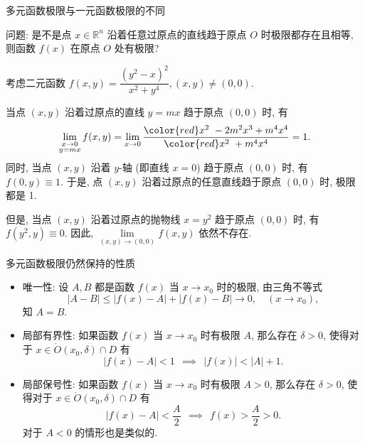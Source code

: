 \begin{frame}{多元函数极限与一元函数极限的不同}


问题: 是不是点 $x \in \mathbb{R}^n$ 沿着任意过原点的直线趋于原点 $O$ 时极限都存在且相等, 则函数 $f(x)$ 在原点 $O$ 处有极限?

\pause

\begin{eg}
考虑二元函数 $f(x, y) = \dfrac{(y^2 - x)^2}{x^2 + y^4}, (x, y) \neq (0, 0).$

\pause

当点 $(x, y)$ 沿着过原点的直线 $y = mx$ 趋于原点 $(0, 0)$ 时, 有
\[\lim\limits_{\substack{x \to 0 \\ y = mx}} f(x, y) = \lim\limits_{x \to 0} \dfrac{{\color{red}x^2} ~ - 2m^2x^3 + m^4 x^4}{{\color{red}x^2} ~ + m^4 x^4} = 1.\]
同时, 当点 $(x, y)$ 沿着 $y$-轴 (即直线 $x = 0$) 趋于原点 $(0, 0)$ 时, 有 $f(0, y) \equiv 1.$ 于是, 点 $(x, y)$ 沿着过原点的任意直线趋于原点 $(0, 0)$ 时, 极限都是 1.

\pause
\vspace{0.4em}

但是, 当点 $(x, y)$ 沿着过原点的抛物线 $x = y^2$ 趋于原点 $(0, 0)$ 时, 有 $f(y^2, y) \equiv 0.$ 因此, $\lim\limits_{(x, y) \to (0, 0)} f(x, y)$ 依然不存在.
\end{eg}

\end{frame}


\begin{frame}{多元函数极限仍然保持的性质}

\begin{itemize}[<+->]
\item 唯一性: 设 $A, B$ 都是函数 $f(x)$ 当 $x \to x_0$ 时的极限, 由三角不等式
\[\lvert A - B \rvert \leqslant \lvert f(x) - A \rvert + \lvert f(x) - B \rvert \to 0, \quad (x \to x_0),\]
知 $A = B.$
\item 局部有界性: 如果函数 $f(x)$ 当 $x \to x_0$ 时有极限 $A$, 那么存在 $\delta > 0$, 使得对于 $x \in \mathring{O}(x_0, \delta) \cap D$ 有
\[\lvert f(x) - A \rvert < 1 ~~ \implies ~~ \lvert f(x) \rvert < \lvert A \rvert + 1.\]
\item 局部保号性: 如果函数 $f(x)$ 当 $x \to x_0$ 时有极限 $A > 0$, 那么存在 $\delta > 0$, 使得对于 $x \in \mathring{O}(x_0, \delta) \cap D$ 有
\[\lvert f(x) - A \rvert < \dfrac{A}{2} ~~ \implies ~~ f(x) > \dfrac{A}{2} > 0.\]
对于 $A < 0$ 的情形也是类似的.
\end{itemize}

\end{frame}

